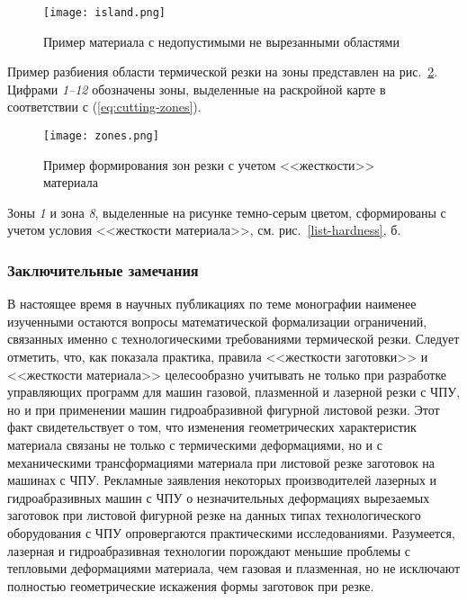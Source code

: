 \begin{figure}[H]
  \centering
  \texttt{[image: island.png]}
  \caption{
    Пример материала с недопустимыми не вырезанными областями
  }
  \label{island}
\end{figure}

Пример разбиения области термической резки на зоны
представлен на
рис.~\ref{zones}.
Цифрами {\it 1--12}
обозначены зоны,
выделенные на раскройной карте
в соответствии с (\ref{eq:cutting-zones}).

\begin{figure}[H]
  \centering
  \texttt{[image: zones.png]}
  \caption{
    Пример формирования зон резки с учетом <<жесткости>> материала
  }
  \label{zones}
\end{figure}

Зоны {\it 1} и зона {\it 8},
выделенные на рисунке темно-серым цветом,
сформированы с учетом условия <<жесткости материала>>,
см. рис.~\ref{list-hardness}, б.

\subsubsection*{
  Заключительные замечания
}

В настоящее время в научных публикациях по теме монографии
наименее изученными остаются вопросы математической формализации ограничений,
связанных именно с технологическими требованиями термической резки.
Следует отметить, что, как показала практика,
правила <<жесткости заготовки>> и <<жесткости материала>>
целесообразно учитывать
не только при разработке управляющих программ для машин газовой,
плазменной и лазерной резки с ЧПУ,
но и при применении машин гидроабразивной фигурной листовой резки.
Этот факт свидетельствует о том,
что изменения геометрических характеристик материала
связаны не только с термическими деформациями,
но и с механическими трансформациями материала
при листовой резке заготовок на машинах с ЧПУ.
Рекламные заявления некоторых производителей
лазерных и гидроабразивных машин с ЧПУ о незначительных
деформациях вырезаемых заготовок при листовой фигурной
резке на данных типах технологического оборудования с ЧПУ
опровергаются практическими исследованиями.
Разумеется, лазерная и гидроабразивная технологии
порождают меньшие проблемы с тепловыми деформациями материала,
чем газовая и плазменная,
но не исключают полностью геометрические искажения формы заготовок при резке.


